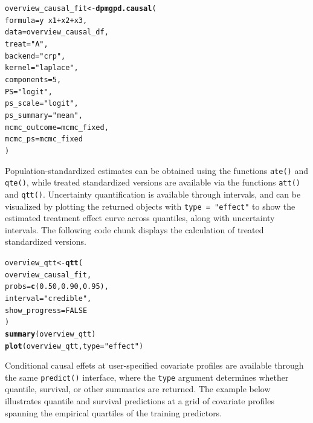 \documentclass[article]{jss}\usepackage[]{graphicx}\usepackage[]{xcolor}
\makeatletter
\newcommand{\hlnum}[1]{\textcolor[rgb]{0.686,0.059,0.569}{#1}}%
\newcommand{\hlsng}[1]{\textcolor[rgb]{0.192,0.494,0.8}{#1}}%
\newcommand{\hlopt}[1]{\textcolor[rgb]{0,0,0}{#1}}%
\newcommand{\hldef}[1]{\textcolor[rgb]{0.345,0.345,0.345}{#1}}%
\newcommand{\hlkwb}[1]{\textcolor[rgb]{0.69,0.353,0.396}{#1}}%
\newcommand{\hlkwc}[1]{\textcolor[rgb]{0.333,0.667,0.333}{#1}}%
\newcommand{\hlkwd}[1]{\textcolor[rgb]{0.737,0.353,0.396}{\textbf{#1}}}%
\newenvironment{kframe}{%
 \def\at@end@of@kframe{}%
 \ifinner\ifhmode%
  \def\at@end@of@kframe{\end{minipage}}%
  \begin{minipage}{\columnwidth}%
 \fi\fi%
 \def\FrameCommand##1{\hskip\@totalleftmargin \hskip-\fboxsep
 \colorbox{shadecolor}{##1}\hskip-\fboxsep
     \hskip-\linewidth \hskip-\@totalleftmargin \hskip\columnwidth}%
 \MakeFramed {\advance\hsize-\width
   \@totalleftmargin\z@ \linewidth\hsize
   \@setminipage}}%
 {\par\unskip\endMakeFramed%
 \at@end@of@kframe}
\newenvironment{knitrout}{}{} %
\DeclareRobustCommand{\code}[1]{\nolinkurl{#1}}
\makeatother
\begin{document}
\begin{knitrout}\footnotesize
{}\color{fgcolor}\begin{kframe}
\begin{alltt}
\hldef{overview_causal_fit} \hlkwb{<-} \hlkwd{dpmgpd.causal}\hldef{(}
  \hlkwc{formula} \hldef{= y} \hlopt{~} \hldef{x1} \hlopt{+} \hldef{x2} \hlopt{+} \hldef{x3,}
  \hlkwc{data} \hldef{= overview_causal_df,}
  \hlkwc{treat} \hldef{=} \hlsng{"A"}\hldef{,}
  \hlkwc{backend} \hldef{=} \hlsng{"crp"}\hldef{,}
  \hlkwc{kernel} \hldef{=} \hlsng{"laplace"}\hldef{,}
  \hlkwc{components} \hldef{=} \hlnum{5}\hldef{,}
  \hlkwc{PS} \hldef{=} \hlsng{"logit"}\hldef{,}
  \hlkwc{ps_scale} \hldef{=} \hlsng{"logit"}\hldef{,}
  \hlkwc{ps_summary} \hldef{=} \hlsng{"mean"}\hldef{,}
  \hlkwc{mcmc_outcome} \hldef{= mcmc_fixed,}
  \hlkwc{mcmc_ps} \hldef{= mcmc_fixed}
\hldef{)}
\end{alltt}
\end{kframe}
\end{knitrout}

Population-standardized estimates can be obtained using the functions \code{ate()} and \code{qte()}, while treated standardized versions are available via the functions \code{att()} and \code{qtt()}. Uncertainty quantification is available through intervals, and can be visualized by plotting the returned objects with \code{type = "effect"} to show the estimated treatment effect curve across quantiles, along with uncertainty intervals. The following code chunk displays the calculation of treated standardized versions.

\begin{knitrout}\footnotesize
{}\color{fgcolor}\begin{kframe}
\begin{alltt}
\hldef{overview_qtt} \hlkwb{<-} \hlkwd{qtt}\hldef{(}
  \hldef{overview_causal_fit,}
  \hlkwc{probs} \hldef{=} \hlkwd{c}\hldef{(}\hlnum{0.50}\hldef{,} \hlnum{0.90}\hldef{,} \hlnum{0.95}\hldef{),}
  \hlkwc{interval} \hldef{=} \hlsng{"credible"}\hldef{,}
  \hlkwc{show_progress} \hldef{=} \hlnum{FALSE}
\hldef{)}
\hlkwd{summary}\hldef{(overview_qtt)}
\hlkwd{plot}\hldef{(overview_qtt,} \hlkwc{type} \hldef{=} \hlsng{"effect"}\hldef{)}
\end{alltt}
\end{kframe}
\end{knitrout}

Conditional causal effets at user-specified covariate profiles are
available through the same \code{predict()} interface, where the
\code{type} argument determines whether quantile, survival, or other
summaries are returned. The example below illustrates quantile and
survival predictions at a grid of covariate profiles spanning the
empirical quartiles of the training predictors.
\end{document}
